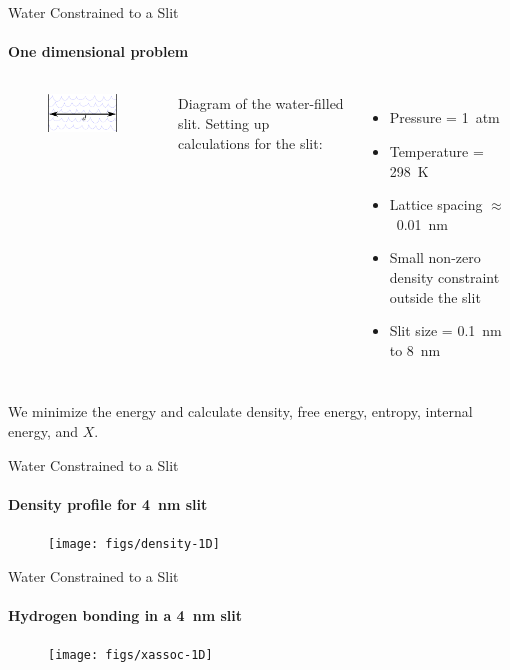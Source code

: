 \documentclass{beamer}
\begin{document}
\begin{frame}[fragile]{Water Constrained to a Slit}
\framesubtitle{One dimensional problem}
\begin{columns}
  \begin{figure}
  \begin{center}
  \includegraphics[width=4.5cm]{figs/slit-diagram}
  \end{center}
  \end{figure}
  Diagram of the water-filled slit.
  Setting up calculations for the slit:
  \begin{itemize}
  \item Pressure = 1~atm
  \item Temperature = 298~K
  \item Lattice spacing $\approx$~0.01~nm 
  \item Small non-zero density constraint outside the slit
  \item Slit size = 0.1~nm to 8~nm
  \end{itemize}
\end{columns}
\vspace{0.8cm}
We minimize the energy and calculate density, free energy, entropy, 
internal energy, and $X$.
\end{frame}

\begin{frame}[fragile]{Water Constrained to a Slit}
\framesubtitle{Density profile for 4~nm slit}
\begin{figure}
\begin{center}
\texttt{[image: figs/density-1D]}
\end{center}
\end{figure} 
\end{frame}

\begin{frame}[fragile]{Water Constrained to a Slit}
\framesubtitle{Hydrogen bonding in a 4~nm slit}
\begin{figure}
\begin{center}
\texttt{[image: figs/xassoc-1D]}
\end{center}
\end{figure} 
\end{frame}
\end{document}
